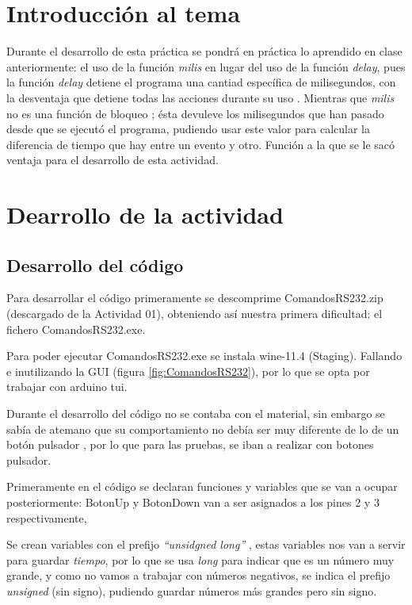 \documentclass[conference]{IEEEtran}
\begin{document}

\section{Introducción al tema}
Durante el desarrollo de esta práctica se pondrá en práctica lo aprendido en clase anteriormente: el uso de la función \textit{milis} en lugar del uso de la función \textit{delay}, pues la función \textit{delay} detiene el programa una cantiad específica de milisegundos, con la desventaja que detiene todas las acciones durante su uso \cite{industrialshields_2020_millis}. Mientras que \textit{milis} no es una función de bloqueo \cite{industrialshields_2020_millis}; ésta devuleve los milisegundos que han pasado desde que se ejecutó el programa, pudiendo usar este valor para calcular la diferencia de tiempo que hay entre un evento y otro. Función a la que se le sacó ventaja para el desarrollo de esta actividad.

\section{Dearrollo de la actividad}
  \subsection{Desarrollo del código}
  Para desarrollar el código primeramente se descomprime ComandosRS232.zip (descargado de la Actividad 01), obteniendo así nuestra primera dificultad: el fichero ComandosRS232.exe.

  Para poder ejecutar ComandosRS232.exe se instala wine-11.4 (Staging). Fallando e inutilizando la GUI (figura \ref{fig:ComandosRS232}), por lo que se opta por trabajar con arduino tui.

  Durante el desarrollo del código no se contaba con el material, sin embargo se sabía de atemano que su comportamiento no debía ser muy diferente de lo de un botón pulsador \cite{keim_2016_capacitive}, por lo que para las pruebas, se iban a realizar con botones pulsador.

  Primeramente en el código se declaran funciones y variables que se van a ocupar posteriormente: BotonUp y BotonDown van a ser asignados a los pines 2 y 3 respectivamente, 

  Se crean variables con el prefijo \textit{``unsidgned long'' }, estas variables nos van a servir para guardar \textit{tiempo}, por lo que se usa \textit{long} para indicar que es un número muy grande, y como no vamos a trabajar con números negativos, se indica el prefijo \textit{unsigned} (sin signo), pudiendo guardar números más grandes pero sin signo.
  
\end{document}
